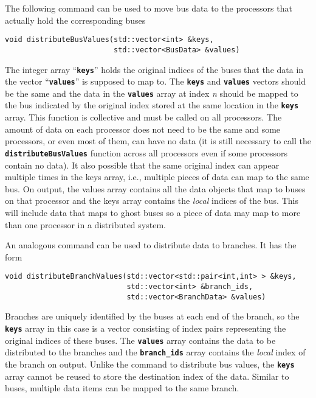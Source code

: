 The following command can be used to move bus data to the processors that actually hold the corresponding buses

{
\color{red}
\begin{Verbatim}[fontseries=b]
void distributeBusValues(std::vector<int> &keys,
                         std::vector<BusData> &values)
\end{Verbatim}
}

The integer array ``\texttt{\textbf{keys}}'' holds the original indices of the buses that the data in the vector ``\texttt{\textbf{values}}'' is supposed to map to. The \texttt{\textbf{keys}} and \texttt{\textbf{values}} vectors should be the same and the data in the \texttt{\textbf{values}} array at index \textit{n} should be mapped to the bus indicated by the original index stored at the same location in the \texttt{\textbf{keys}} array. This function is collective and must be called on all processors. The amount of data on each processor does not need to be the same and some processors, or even most of them, can have no data (it is still necessary to call the \texttt{\textbf{distributeBusValues}} function across all processors even if some processors contain no data). It also possible that the same original index can appear multiple times in the keys array, i.e., multiple pieces of data can map to the same bus. On output, the values array contains all the data objects that map to buses on that processor and the keys array contains the \textit{local} indices of the bus. This will include data that maps to ghost buses so a piece of data may map to more than one processor in a distributed system.

An analogous command can be used to distribute data to branches. It has the form

{
\color{red}
\begin{Verbatim}[fontseries=b]
void distributeBranchValues(std::vector<std::pair<int,int> > &keys,
                            std::vector<int> &branch_ids,
                            std::vector<BranchData> &values)
\end{Verbatim}
}

Branches are uniquely identified by the buses at each end of the branch, so the \texttt{\textbf{keys}} array in this case is a vector consisting of index pairs representing the original indices of these buses. The \texttt{\textbf{values}} array contains the data to be distributed to the branches and the \texttt{\textbf{branch\_ids}} array contains the \textit{local} index of the branch on output. Unlike the command to distribute bus values, the \texttt{\textbf{keys}} array cannot be reused to store the destination index of the data. Similar to buses, multiple data items can be mapped to the same branch.


